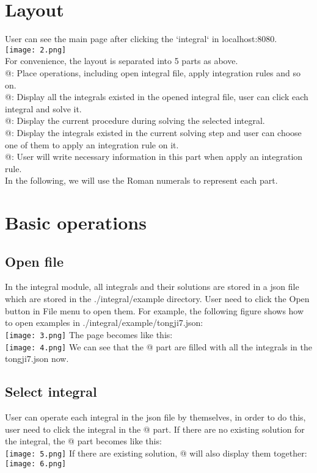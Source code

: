 \documentclass[titlepage]{article}
\makeatletter
\newcommand*{\rom}[1]{\expandafter\@slowromancap\romannumeral #1@}
\makeatother
\begin{document}
\section{Layout}
User can see the main page after clicking the `integral` in \colorbox{mygray}{localhost:8080}.\\
\texttt{[image: 2.png]}\\
For convenience, the layout is separated into 5 parts as above.\\
\rom{1}: Place operations, including open integral file, apply integration rules and so on.\\
\rom{2}: Display all the integrals existed in the opened integral file, user can click each integral and solve it.\\
\rom{3}: Display the current procedure during solving the selected integral.\\
\rom{4}: Display the integrals existed in the current solving step and user can choose one of them to apply an integration rule on it.\\
\rom{5}: User will write necessary information in this part when apply an integration rule. \\
In the following, we will use the Roman numerals to represent each part.
\section{Basic operations}
\subsection{Open file}
In the integral module, all integrals and their solutions are stored in a json file which are stored in the ./integral/example directory. User need to click the \colorbox{mygray}{Open} button in File menu to open them. For example, the following figure shows how to open examples in ./integral/example/tongji7.json:\\
\texttt{[image: 3.png]}
The page becomes like this:\\
\texttt{[image: 4.png]}
We can see that the \rom{2} part are filled with all the integrals in the tongji7.json now.\\
\subsection{Select integral}
User can operate each integral in the json file by themselves, in order to do this, user need to click the integral in the \rom{2} part. If there are  no existing solution for the integral, the \rom{3} part becomes like this:\\
\texttt{[image: 5.png]}
If there are existing solution, \rom{3} will also display them together:\\
\texttt{[image: 6.png]}
\end{document}
